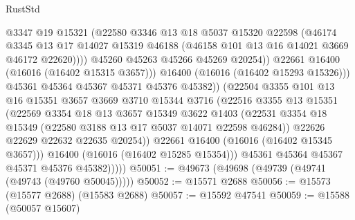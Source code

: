 \begin{lexlean}{RustStd}
\begin{coremodule}
                              @3347
                              @19
                              @15321
                              (@22580
                                @3346
                                @13
                                @18
                                @5037
                                @15320
                                @22598
                                (@46174
                                  @3345
                                  @13
                                  @17
                                  @14027
                                  @15319
                                  @46188
                                  (@46158 @101 @13 @16 @14021 @3669 @46172 @22620))))
                            @45260
                            @45263
                            @45266
                            @45269
                            @20254))
                        @22661
                        @16400
                        (@16016 (@16402 @15315 @3657)))
                      @16400
                      (@16016 (@16402 @15293 @15326)))
                    @45361
                    @45364
                    @45367
                    @45371
                    @45376
                    @45382))
                (@22504
                  @3355
                  @101
                  @13
                  @16
                  @15351
                  @3657
                  @3669
                  @3710
                  @15344
                  @3716
                  (@22516
                    @3355
                    @13
                    @15351
                    (@22569
                      @3354
                      @18
                      @13
                      @3657
                      @15349
                      @3622
                      @1403
                      (@22531 @3354 @18 @15349 (@22580 @3188 @13 @17 @5037 @14071 @22598 @46284))
                      @22626
                      @22629
                      @22632
                      @22635
                      @20254))
                  @22661
                  @16400
                  (@16016 (@16402 @15345 @3657)))
                @16400
                (@16016 (@16402 @15285 @15354)))
              @45361
              @45364
              @45367
              @45371
              @45376
              @45382)))))
@50051 := @49673 (@49698 (@49739 (@49741 (@49743 (@49760 @50045)))))
@50052 := @15571 @2688
@50056 := @15573 (@15577 @2688) (@15583 @2688)
@50057 := @15592 @47541
@50059 := @15588 (@50057 @15607)

\end{coremodule}
\end{lexlean}
